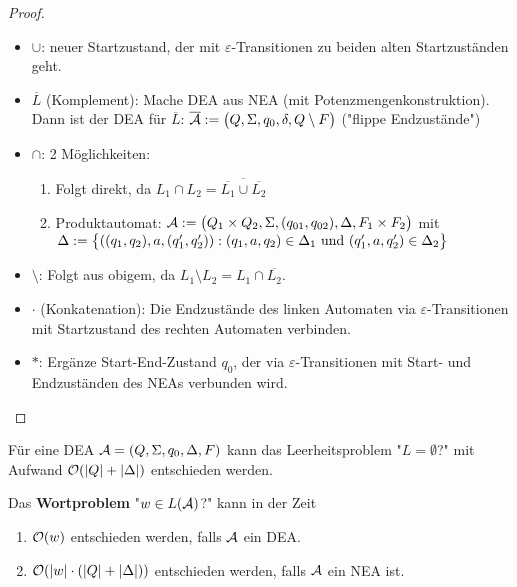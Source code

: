 \begin{proof}\
	\begin{itemize}
		\item $\cup$: neuer Startzustand, der mit $\varepsilon$-Transitionen zu beiden alten Startzuständen geht.
		\item $\overline{L}$ (Komplement): Mache DEA aus NEA (mit Potenzmengenkonstruktion).
	Dann ist der DEA für $\overline{L}$: $\overline{\mathcal{A}}:=\big(Q,\Sigma,q_0,\delta,Q\setminus F\big)$ ("flippe Endzustände")
		\item $\cap$: 2 Möglichkeiten:
		\begin{enumerate}
			\item Folgt direkt, da $L_1\cap L_2=\overline{\overline{L_1}\cup\overline{L_2}}$
			\item Produktautomat: $\mathcal{A}:=\big(Q_1\times Q_2,\Sigma,(q_{01},q_{02}),\Delta,F_1\times F_2\big)$ mit\\
			$\Delta:=\big\lbrace((q_1,q_2),a,(q_1',q_2')):(q_1,a,q_2)\in\Delta_1\text{ und }(q_1',a,q_2')\in\Delta_2\big\rbrace$
		\end{enumerate}				
		\item $\setminus$: Folgt aus obigem, da $L_1\setminus L_2=L_1\cap\overline{L_2}$.
		\item $\cdot$ (Konkatenation): Die Endzustände des linken Automaten via $\varepsilon$-Transitionen mit Startzustand des rechten Automaten verbinden.
		\item $\ast$: Ergänze Start-End-Zustand $q_0$, der via $\varepsilon$-Transitionen mit Start- und Endzuständen des NEAs verbunden wird.
	\end{itemize}
\end{proof}

\begin{satz}\label{satz4.3}
	Für eine DEA $\mathcal{A}=(Q,\Sigma,q_0,\Delta,F)$ kann das Leerheitsproblem "$L=\emptyset$?" mit Aufwand $\mathcal{O}(|Q|+|\Delta|)$ entschieden werden.
\end{satz}

\begin{satz}\label{satz4.4+4.5}
	Das \textbf{Wortproblem} "$w\in L(\mathcal{A})$?" kann in der Zeit
	\begin{enumerate}
		\item $\mathcal{O}(w)$ entschieden werden, falls $\mathcal{A}$ ein DEA.
		\item $\mathcal{O}(|w|\cdot(|Q|+|\Delta|))$ entschieden werden, falls $\mathcal{A}$ ein NEA ist.
	\end{enumerate}
\end{satz}

